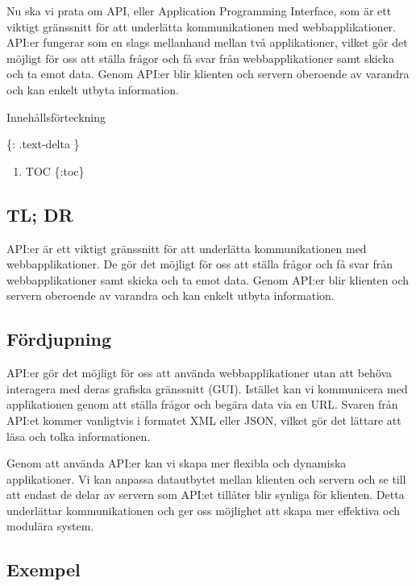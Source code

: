 Nu ska vi prata om API, eller Application Programming Interface, som är
ett viktigt gränssnitt för att underlätta kommunikationen med
webbapplikationer. API:er fungerar som en slags mellanhand mellan två
applikationer, vilket gör det möjligt för oss att ställa frågor och få
svar från webbapplikationer samt skicka och ta emot data. Genom API:er
blir klienten och servern oberoende av varandra och kan enkelt utbyta
information.

Innehållsförteckning

\{: .text-delta \}

\begin{enumerate}
\def\labelenumi{\arabic{enumi}.}
\tightlist
\item
  TOC \{:toc\}
\end{enumerate}

\hypertarget{tl-dr}{%
\subsection{TL; DR}\label{tl-dr}}

API:er är ett viktigt gränssnitt för att underlätta kommunikationen med
webbapplikationer. De gör det möjligt för oss att ställa frågor och få
svar från webbapplikationer samt skicka och ta emot data. Genom API:er
blir klienten och servern oberoende av varandra och kan enkelt utbyta
information.

\hypertarget{fuxf6rdjupning}{%
\subsection{Fördjupning}\label{fuxf6rdjupning}}

API:er gör det möjligt för oss att använda webbapplikationer utan att
behöva interagera med deras grafiska gränssnitt (GUI). Istället kan vi
kommunicera med applikationen genom att ställa frågor och begära data
via en URL. Svaren från API:et kommer vanligtvis i formatet XML eller
JSON, vilket gör det lättare att läsa och tolka informationen.

Genom att använda API:er kan vi skapa mer flexibla och dynamiska
applikationer. Vi kan anpassa datautbytet mellan klienten och servern
och se till att endast de delar av servern som API:et tillåter blir
synliga för klienten. Detta underlättar kommunikationen och ger oss
möjlighet att skapa mer effektiva och modulära system.

\hypertarget{exempel}{%
\subsection{Exempel}\label{exempel}}

